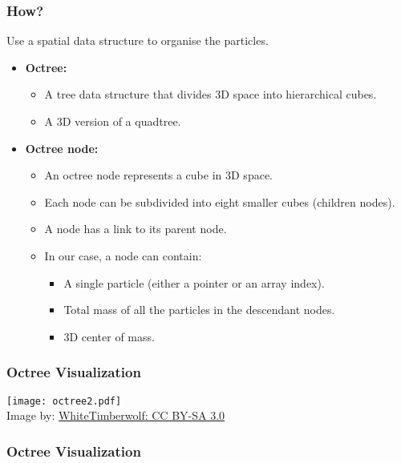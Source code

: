 \begin{frame}
  \frametitle{How?}
  Use a spatial data structure to organise the particles.

    \vspace*{2mm}
  \begin{itemize}
    \item \textbf{Octree:}
    \begin{itemize}
     \item  A tree data structure that divides 3D space into hierarchical cubes.
     \item A 3D version of a quadtree.
    \end{itemize}

    \vspace*{2mm}
    \item \textbf{Octree node:}
    \begin{itemize}
    \item An octree node represents a cube in 3D space.
    \item Each node can be subdivided into eight smaller cubes (children nodes).
    \item A node has a link to its parent node.
    \item In our case, a node can contain:
      \begin{itemize}
        \item A single particle (either a pointer or an array index).
        \item Total mass of all the particles in the descendant nodes.
        \item 3D center of mass.
      \end{itemize}
    \end{itemize}

  \end{itemize}
\end{frame}


\begin{frame}[fragile]
  \frametitle{Octree Visualization}
  \centering
  \texttt{[image: octree2.pdf]} \\
  \scriptsize Image by: \href{https://commons.wikimedia.org/wiki/File:Octree2.svg}{WhiteTimberwolf: CC BY-SA 3.0}
\end{frame}

\begin{frame}
  \frametitle{Octree Visualization}
    \centering
\end{frame}

